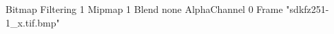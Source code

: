 {Bitmap
	{Filtering 1}
	{Mipmap 1}
	{Blend none}
	{AlphaChannel 0}
	{Frame "sdkfz251-1_x.tif.bmp"}
}
